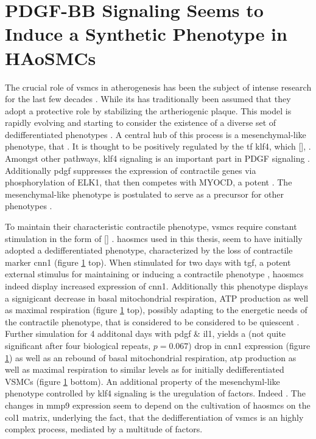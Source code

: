 \section{PDGF-BB Signaling Seems to Induce a Synthetic Phenotype in HAoSMCs}

The crucial role of \acp{vsmc} in atherogenesis has been the subject of intense research for the last few decades \cite{}. While its has traditionally been assumed that they adopt a protective role by stabilizing the artheriogenic plaque. This model is rapidly evolving and starting to consider the existence of a diverse set of dedifferentiated phenotypes \cite{}. A central hub of this process is a mesenchymal-like phenotype, that . It is thought to be positively regulated by the \ac{tf} \ac{klf4}, which [], . Amongst other pathways, \ac{klf4} signaling is an important part in PDGF signaling \cite{}. Additionally \ac{pdgf} suppresses the expression of contractile genes via phosphorylation of ELK1, that then competes with MYOCD, a potent \cite{}. The mesenchymal-like phenotype is postulated to serve as a precursor for other phenotypes \cite{yapSixShadesVascular2021}.

To maintain their characteristic contractile phenotype, \acp{vsmc} require constant stimulation in the form of [] \cite{}. \acp{haosmc} used in this thesis, seem to have initially adopted a dedifferentiated phenotype, characterized by the loss of contractile marker \ac{cnn1} \cite{CNN1 as contractile marker in yapSixShadesVascular2021} (figure \ref{} top). When stimulated for two days with \ac{tgf}, a potent external stimulus for maintaining or inducing a contractile phenotype \cite{}, \acp{haosmc} indeed display increased expression of \ac{cnn1}. Additionally this phenotype displays a signigicant decrease in  basal mitochondrial respiration, ATP production as well as maximal respiration (figure \ref{} top), possibly adapting to the energetic needs of the contractile phenotype, that is considered to be considered to be quiescent \cite{get the source from yapSixShadesVascular2021}. Further simulation for 4 additonal days with \ac{pdgf} \& \ac{il1}, yields a (not quite significant after four biological repeats, $p=0.067$) drop in \ac{cnn1} expression (figure \ref{}) as well as an rebound of basal mitochondrial respiration, \ac{atp} production as well as maximal respiration to similar levels as for initially dedifferentiated VSMCs (figure \ref{} bottom). An additional property of the mesenchyml-like phenotype controlled by \ac{klf4} signaling is the uregulation of factors. Indeed . The changes in \ac{mmp9} expression seem to depend on the cultivation of \acp{haosmc} on the \ac{col1} matrix, underlying the fact, that the dedifferentiation of \acp{vsmc} is an highly complex process, mediated by a multitude of factors.

